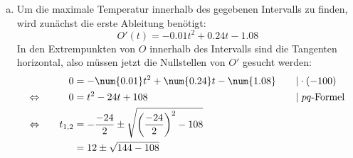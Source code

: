 \begin{exercise}
\begin{enumerate}[a)]
\begin{equation*}
              \num{0.36}\si[per-mode=symbol]{\celsius\per\hour}
            \end{equation*}
            beschreibt die momentane Temperaturänderung
            der Oberfläche des Sees um 12:00 Uhr in
            \si{\celsius} pro Stunde.
      \item Um die maximale Temperatur innerhalb
            des gegebenen Intervalls zu finden,
            wird zunächst die erste Ableitung
            benötigt:
            \begin{equation*}
              O'(t)=-\num{0.01}t^{2}+\num{0.24}t-\num{1.08}
            \end{equation*}
            In den Extrempunkten von $O$ innerhalb des
            Intervalls sind die Tangenten horizontal,
            also müssen jetzt die Nullstellen von $O'$
            gesucht werden:
            \begin{alignat*}{3}
              \relax&\quad
              &
              0&=-\num{0.01}t^{2}+\num{0.24}t-\num{1.08}
              &
              \quad&|\cdot(-100)
              \\
              \Leftrightarrow&\quad
              &
              0&=t^{2}-24t+108
              &
              \quad&|\;\text{$pq$-Formel}
              \\
              \Leftrightarrow&\quad
              &
              t_{1,2}&=-\frac{-24}{2}\pm\sqrt{\left(\frac{-24}{2}\right)^2-108}
              &
              \quad&\relax
              \\
              \relax&\quad
              &
              &=12\pm\sqrt{144-108}
              &
              \quad&\relax
              \\

\end{alignat*}
\end{enumerate}
\end{exercise}
